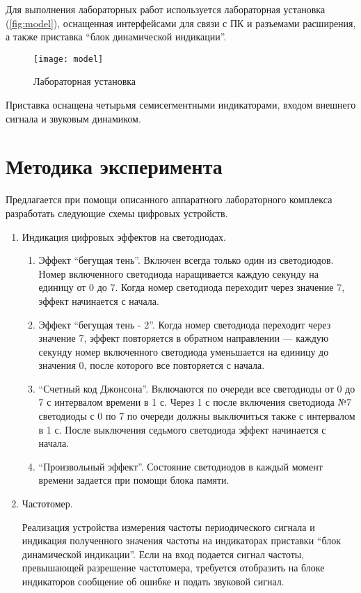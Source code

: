 Для выполнения лабораторных работ используется лабораторная установка (\autoref{fig:model}), оснащенная интерфейсами для связи с ПК и разъемами расширения, а также приставка \enquote{блок динамической индикации}.

\begin{figure}[h]%
\centering
\texttt{[image: model]}%
\caption[Лабораторная установка.]{Лабораторная установка}%
\label{fig:model}%
\end{figure}

Приставка оснащена четырьмя семисегментными индикаторами, входом внешнего сигнала и звуковым динамиком.

\section{Методика эксперимента\label{sec:task}}

Предлагается при помощи описанного аппаратного лабораторного комплекса разработать следующие схемы цифровых устройств.

\begin{enumerate}[labelindent=\parindent,leftmargin=*]

\item Индикация цифровых эффектов на светодиодах.

\begin{enumerate}[label=\asbuk*)]

\item Эффект \enquote{бегущая тень}. Включен всегда только один из светодиодов. Номер включенного светодиода наращивается каждую секунду на единицу от 0 до 7. Когда номер светодиода переходит через значение 7, эффект начинается с начала.

\item Эффект \enquote{бегущая тень - 2}. Когда номер светодиода переходит через значение 7, эффект повторяется в обратном направлении --- каждую секунду номер включенного светодиода уменьшается на единицу до значения 0, после которого все повторяется с начала.

\item \enquote{Счетный код Джонсона}. Включаются по очереди все светодиоды от 0 до 7 с интервалом времени в 1 с. Через 1 с после включения светодиода №7 светодиоды с 0 по 7 по очереди должны выключиться также с интервалом в 1 с. После выключения седьмого светодиода эффект начинается с начала.

\item \enquote{Произвольный эффект}. Состояние светодиодов в каждый момент времени задается при помощи блока памяти.

\end{enumerate}

\item Частотомер.

Реализация устройства измерения частоты периодического сигнала и индикация полученного значения частоты на индикаторах приставки \enquote{блок динамической индикации}. Если на вход подается сигнал частоты, превышающей разрешение частотомера, требуется отобразить на блоке индикаторов сообщение об ошибке и подать звуковой сигнал.

\end{enumerate}

